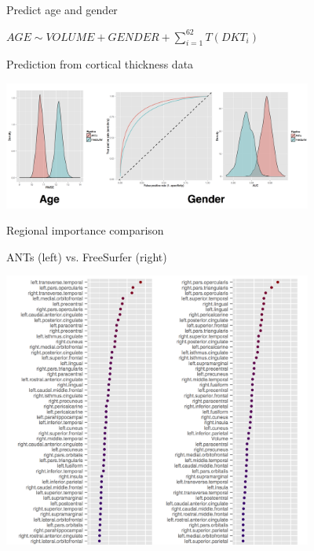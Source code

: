 \documentclass[ignorenonframetext,]{beamer}
\begin{document}
\begin{frame}{Predict age and gender}

\begin{centering}

$AGE \sim VOLUME + GENDER + \sum_{i=1}^{62} T(DKT_i)$

\end{centering}

\end{frame}

\begin{frame}{Prediction from cortical thickness data}

\begin{centering}

\includegraphics[width=4in]{./evaluation/figures/evaluation.png}

\end{centering}

\end{frame}

\begin{frame}{Regional importance comparison}

\begin{centering}

\small
ANTs (left) vs. FreeSurfer (right)

\includegraphics[width=4in]{./evaluation/figures/antsvfreesurfer_Importance.png}

\end{centering}

\end{frame}
\end{document}

